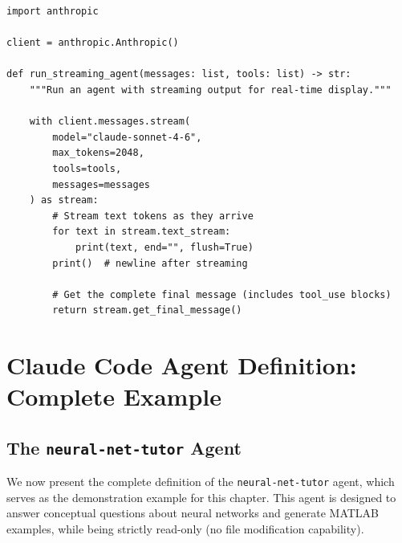 \documentclass[11pt,letterpaper]{article}
\begin{document}
\begin{lstlisting}[style=PythonStyle, caption={Streaming agent response}]
import anthropic

client = anthropic.Anthropic()

def run_streaming_agent(messages: list, tools: list) -> str:
    """Run an agent with streaming output for real-time display."""

    with client.messages.stream(
        model="claude-sonnet-4-6",
        max_tokens=2048,
        tools=tools,
        messages=messages
    ) as stream:
        # Stream text tokens as they arrive
        for text in stream.text_stream:
            print(text, end="", flush=True)
        print()  # newline after streaming

        # Get the complete final message (includes tool_use blocks)
        return stream.get_final_message()
\end{lstlisting}

\section{Claude Code Agent Definition: Complete Example}

\subsection{The \texttt{neural-net-tutor} Agent}

We now present the complete definition of the \texttt{neural-net-tutor} agent, which serves as the demonstration example for this chapter. This agent is designed to answer conceptual questions about neural networks and generate MATLAB examples, while being strictly read-only (no file modification capability).
\end{document}
